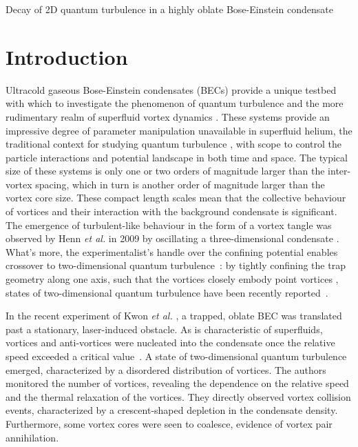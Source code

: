 \begin{chapter}{\label{cha:shin}Decay of 2D quantum turbulence in a highly oblate Bose-Einstein condensate}
\newcommand{\gws}[1]{\textcolor{blue}{#1}}
\newcommand{\ngp}[1]{#1}%
\newcommand{\etal}{{\it et al.}~}
\newcommand{\etalcc}{{\it et al.}}
\newcommand{\boldell}{{\mbox{\boldmath $\ell$}}}
\newcommand{\intr}{\int d \mathbf{r}}
\newcommand{\bfrt}{({\bf{r}},t)}
\newcommand{\fprt}{f({\mathbf{p}}, {\mathbf{r}},t)}

\section{Introduction}
Ultracold gaseous Bose-Einstein condensates (BECs) provide a unique testbed with which to investigate the phenomenon of quantum turbulence and the more rudimentary realm of superfluid vortex dynamics \citep{white_anderson_14,barenghi_skrbek_14}.  These systems provide an impressive degree of parameter manipulation unavailable in superfluid helium, the traditional context for studying quantum turbulence \citep{barenghi_donnelly_01}, with scope to control the particle interactions and potential landscape in both time and space.  The typical size of these systems is only one or two orders of magnitude larger than the inter-vortex spacing, which in turn is another order of magnitude larger than the vortex core size.  These compact length scales mean that the collective behaviour of vortices and their interaction with the background condensate is significant.  The emergence of turbulent-like behaviour in the form of a vortex tangle was observed by Henn {\it et al.} in 2009 by oscillating a three-dimensional condensate \cite{henn_seman_09}.  What's more, the experimentalist's handle over the confining potential enables crossover to two-dimensional quantum turbulence~\cite{parker2005}: by tightly confining the trap geometry along one axis, such that the vortices closely embody point vortices \cite{middelkamp}, states of two-dimensional quantum turbulence have been recently reported~\citep{neely_bradley_13,kwon_moon_14}.

In the recent experiment of Kwon {\it et al.} \citep{kwon_moon_14}, a trapped, oblate BEC was translated past a stationary, laser-induced obstacle.  As is characteristic of superfluids, vortices and anti-vortices were nucleated into the condensate once the relative speed exceeded a critical value~\cite{frisch92}.  \ngp{A state of two-dimensional quantum turbulence emerged, characterized by a disordered distribution of vortices.}  The authors monitored the number of vortices, revealing the dependence on the relative speed and the thermal relaxation of the vortices.  They directly observed vortex collision events, characterized by a crescent-shaped depletion in the condensate density. Furthermore, some vortex cores were seen to coalesce, evidence of vortex pair annihilation.


\end{chapter}
